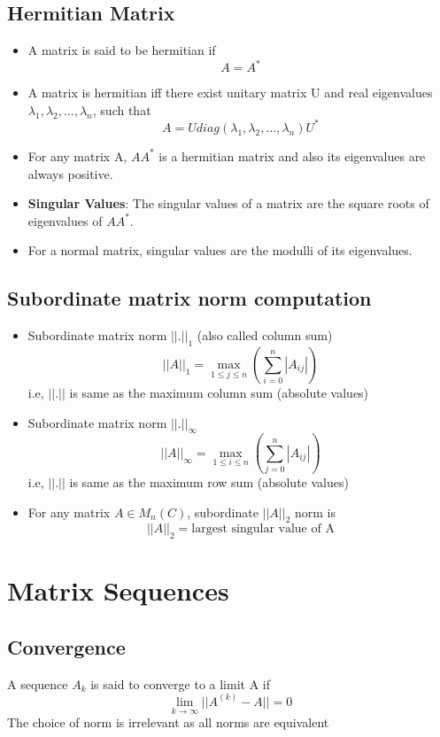 \documentclass{article}
\begin{document}
\subsection{Hermitian Matrix}
	\begin{itemize}
	\item A matrix is said to be hermitian if
		\[A = A^*\]
	\item A matrix is hermitian iff there exist unitary matrix U and real eigenvalues $\lambda_1,\lambda_2,\hdots,\lambda_n$, such that 
		\[A = Udiag(\lambda_1,\lambda_2,\hdots,\lambda_n) U^*\]

	\item For any matrix A, $AA^*$ is a hermitian matrix and also its eigenvalues are always positive. 
	\item \textbf{Singular Values}: The singular values of a matrix are the square roots of eigenvalues of $AA^*$.
	\item For a normal matrix, singular values are the modulli of its eigenvalues.

	\end{itemize}

\subsection{Subordinate matrix norm computation}
	\begin{itemize}
	\item Subordinate matrix norm $||.||_1$ (also called column sum)
		\[||A||_1 = \max_{1\leq j\leq n} (\sum_{i=0}^n |A_{ij}|)\]
	i.e, $||.||$ is same as the maximum column sum (absolute values)

	\item Subordinate matrix norm $||.||_\infty$ 
		\[||A||_\infty = \max_{1\leq i\leq n} (\sum_{j=0}^n |A_{ij}|)\]
	i.e, $||.||$ is same as the maximum row sum (absolute values)

	\item For any matrix $A \in M_n(C)$, subordinate $||A||_2$ norm is
		\[||A||_2 = \text{largest singular value of A} \]

	\end{itemize}

\section{Matrix Sequences}
	\subsection{Convergence}
	A sequence $A_k$ is said to converge to a limit A if
		\[\lim_{k\rightarrow \infty} ||A^{(k)}-A|| =0\]
	The choice of norm is irrelevant as all norms are equivalent
\end{document}
